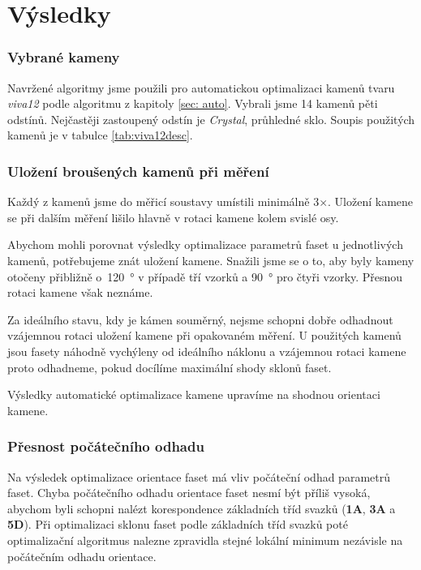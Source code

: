   
\part{Výsledky}

\section{Vybrané kameny}

Navržené algoritmy jsme použili pro automatickou optimalizaci kamenů tvaru \textit{viva12} podle algoritmu z kapitoly \ref{sec: auto}. Vybrali jsme 14 kamenů pěti odstínů. Nejčastěji zastoupený odstín je \textit{Crystal}, průhledné sklo. Soupis použitých kamenů je v tabulce \ref{tab:viva12desc}. 

\section{Uložení broušených kamenů při měření}

 	Každý z kamenů jsme do měřicí soustavy umístili minimálně 3$\times$. Uložení kamene se při dalším měření  lišilo hlavně v rotaci kamene kolem svislé osy.

	Abychom mohli porovnat výsledky optimalizace parametrů faset u jednotlivých kamenů, potřebujeme znát uložení kamene. Snažili jsme se o to, aby byly kameny otočeny přibližně o~\SI{120}{\degree} v případě tří vzorků a \SI{90}{\degree} pro čtyři vzorky. Přesnou rotaci kamene však neznáme.
	
	Za ideálního stavu, kdy je kámen souměrný, nejsme schopni dobře odhadnout vzájemnou rotaci uložení kamene při opakovaném měření. U použitých kamenů jsou fasety náhodně vychýleny od ideálního náklonu a vzájemnou rotaci kamene proto odhadneme, pokud docílíme maximální shody sklonů faset.   
	
	Výsledky automatické optimalizace kamene upravíme na shodnou orientaci kamene. 
	
\section{Přesnost počátečního odhadu}
	
	Na výsledek optimalizace orientace faset má vliv počáteční odhad parametrů faset. Chyba počátečního odhadu orientace faset nesmí být příliš vysoká, abychom byli schopni nalézt korespondence základních tříd svazků (\textbf{1A}, \textbf{3A} a \textbf{5D}). Při optimalizaci sklonu faset podle základních tříd svazků poté optimalizační algoritmus nalezne zpravidla stejné lokální minimum nezávisle na počátečním odhadu orientace. 
	
